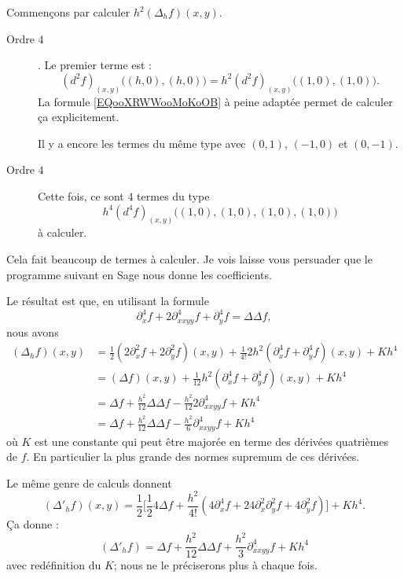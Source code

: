 Commençons par calculer \( h^2(\Delta_hf)(x,y)\). 
\begin{description}
    \item[Ordre \( 4\)]. Le premier terme est :
        \begin{equation}
            (d^2f)_{(x,y)}\big( (h,0),(h,0) \big)=h^2(d^2f)_{(x,y)}\big( (1,0),(1,0) \big).
        \end{equation}
        La formule \eqref{EQooXRWWooMoKoOB} à peine adaptée permet de calculer ça explicitement.

        Il y a encore les termes du même type avec \( (0,1)\), \( (-1,0)\) et \( (0,-1)\).

    \item[Ordre \( 4\)]
        Cette fois, ce sont \( 4\) termes du type
        \begin{equation}
            h^4(d^4f)_{(x,y)}\big( (1,0),(1,0),(1,0),(1,0) \big)
        \end{equation}
        à calculer.
\end{description}
Cela fait beaucoup de termes à calculer. Je vois laisse vous persuader que le programme suivant en Sage nous donne les coefficients.


Le résultat est que, en utilisant la formule
\begin{equation}
    \partial^4_xf+2\partial_{xxyy}^4f+\partial^4_yf=\Delta\Delta f,
\end{equation}
nous avons
\begin{subequations}
    \begin{align}
    (\Delta_hf)(x,y)&=\frac{ 1 }{2}(2\partial_x^2f+2\partial_y^2f)(x,y)+\frac{1}{ 4! }2h^2(\partial^4_xf+\partial_y^4f)(x,y)+Kh^4\\
    &=(\Delta f)(x,y)+\frac{1}{ 12 }h^2(\partial_x^4f+\partial_y^4f)(x,y)+Kh^4\\
    &=\Delta f+\frac{ h^2 }{ 12 }\Delta\Delta f-\frac{ h^2 }{ 12 }2\partial^4_{xxyy}f+Kh^4\\
    &=\Delta f+\frac{ h^2 }{ 12 }\Delta\Delta f-\frac{ h^2 }{ 6 }\partial^4_{xxyy}f+Kh^4
    \end{align}
\end{subequations}
où \( K\) est une constante qui peut être majorée en terme des dérivées quatrièmes de \( f\). En particulier la plus grande des normes supremum de ces dérivées.

Le même genre de calculs donnent
\begin{equation}
        (\Delta'_hf)(x,y)=\frac{ 1 }{2}\Big[  \frac{ 1 }{2}4\Delta f+\frac{h^2}{ 4! }(4\partial_x^4f+24\partial_x^2\partial_y^2f+4\partial_y^2f)   \Big]+Kh^4.
\end{equation}
Ça donne :
\begin{equation}
    (\Delta'_hf)=\Delta f+\frac{ h^2 }{ 12 }\Delta\Delta f+\frac{ h^2 }{ 3 }\partial^4_{xxyy}f+Kh^4
\end{equation}
avec redéfinition du \( K\); nous ne le préciserons plus à chaque fois.


